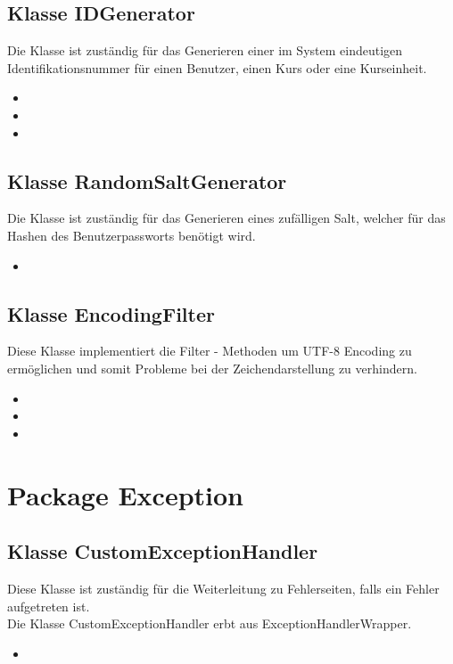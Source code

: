	\subsection{Klasse IDGenerator}
	Die Klasse ist zuständig für das Generieren einer im System eindeutigen Identifikationsnummer für einen Benutzer, einen Kurs oder eine Kurseinheit.
	\begin{itemize}
		\item {}
		\item {}
		\item {}
	\end{itemize}
	
	\subsection{Klasse RandomSaltGenerator}
	Die Klasse ist zuständig für das Generieren eines zufälligen Salt, welcher für das Hashen des Benutzerpassworts benötigt wird.
	\begin{itemize}
		\item {}
	\end{itemize} 
	
	\subsection{Klasse EncodingFilter}
	Diese Klasse implementiert die Filter - Methoden um UTF-8 Encoding zu
	ermöglichen und somit Probleme bei der Zeichendarstellung zu verhindern.
	\begin{itemize}
		\item \override
		\item \override
		\item \override
	\end{itemize}
	
	\section{Package Exception}
	\subsection{Klasse CustomExceptionHandler}
	Diese Klasse ist zuständig für die Weiterleitung zu Fehlerseiten, falls ein Fehler aufgetreten
	ist. \\
	Die Klasse CustomExceptionHandler erbt aus ExceptionHandlerWrapper.
		\begin{itemize}
			\item \override
		\end{itemize}
		

